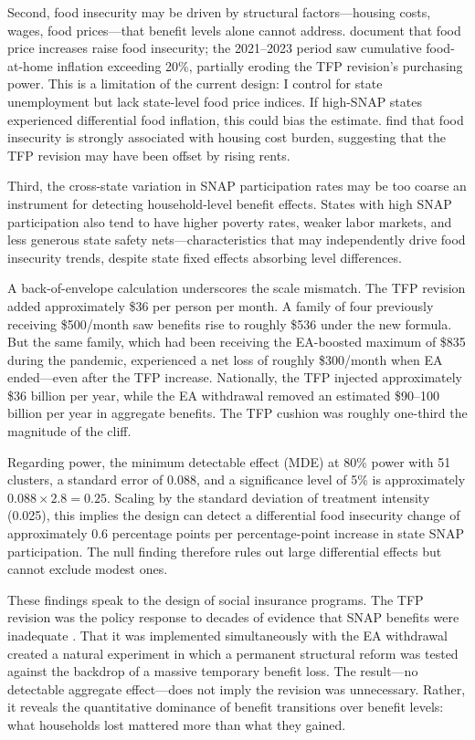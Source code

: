 \documentclass[12pt]{article}
\begin{document}
Second, food insecurity may be driven by structural factors---housing costs, wages, food prices---that benefit levels alone cannot address. \citet{gregory2013} document that food price increases raise food insecurity; the 2021--2023 period saw cumulative food-at-home inflation exceeding 20\%, partially eroding the TFP revision's purchasing power. This is a limitation of the current design: I control for state unemployment but lack state-level food price indices. If high-SNAP states experienced differential food inflation, this could bias the estimate. \citet{gundersen2015} find that food insecurity is strongly associated with housing cost burden, suggesting that the TFP revision may have been offset by rising rents.

Third, the cross-state variation in SNAP participation rates may be too coarse an instrument for detecting household-level benefit effects. States with high SNAP participation also tend to have higher poverty rates, weaker labor markets, and less generous state safety nets---characteristics that may independently drive food insecurity trends, despite state fixed effects absorbing level differences.

A back-of-envelope calculation underscores the scale mismatch. The TFP revision added approximately \$36 per person per month. A family of four previously receiving \$500/month saw benefits rise to roughly \$536 under the new formula. But the same family, which had been receiving the EA-boosted maximum of \$835 during the pandemic, experienced a net loss of roughly \$300/month when EA ended---even after the TFP increase. Nationally, the TFP injected approximately \$36 billion per year, while the EA withdrawal removed an estimated \$90--100 billion per year in aggregate benefits. The TFP cushion was roughly one-third the magnitude of the cliff.

Regarding power, the minimum detectable effect (MDE) at 80\% power with 51 clusters, a standard error of 0.088, and a significance level of 5\% is approximately $0.088 \times 2.8 = 0.25$. Scaling by the standard deviation of treatment intensity (0.025), this implies the design can detect a differential food insecurity change of approximately 0.6 percentage points per percentage-point increase in state SNAP participation. The null finding therefore rules out large differential effects but cannot exclude modest ones.

These findings speak to the design of social insurance programs. The TFP revision was the policy response to decades of evidence that SNAP benefits were inadequate \citep{hoynes2016, bitler2023}. That it was implemented simultaneously with the EA withdrawal created a natural experiment in which a permanent structural reform was tested against the backdrop of a massive temporary benefit loss. The result---no detectable aggregate effect---does not imply the revision was unnecessary. Rather, it reveals the quantitative dominance of benefit transitions over benefit levels: what households lost mattered more than what they gained.
\end{document}

